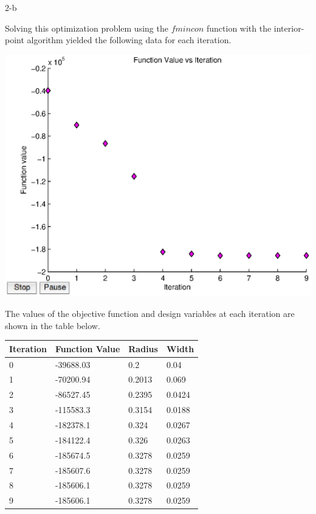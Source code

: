 \documentclass[11pt]{article}
\begin{document}
\begin{problem}{2-b}
\end{problem}
\begin{solution}
Solving this optimization problem using the $fmincon$ function with the interior-point algorithm yielded the following data for each iteration.

\begin{center}
\includegraphics[scale=0.75]{problem2/problem2.eps}
\end{center}

The values of the objective function and design variables at each iteration are shown in the table below.
\begin{center}
\begin{table}
    \begin{tabular}{|l|l|l|l|}
        \hline
       Iteration & Function Value & Radius & Width\\ \hline
0 & -39688.03 & 0.2 & 0.04\\ 
1 & -70200.94 & 0.2013 & 0.069\\ 
2 & -86527.45 & 0.2395 & 0.0424\\ 
3 & -115583.3 & 0.3154 & 0.0188\\ 
4 & -182378.1 & 0.324 & 0.0267\\ 
5 & -184122.4 & 0.326 & 0.0263\\ 
6 & -185674.5 & 0.3278 & 0.0259\\ 
7 & -185607.6 & 0.3278 & 0.0259\\ 
8 & -185606.1 & 0.3278 & 0.0259\\ 
9 & -185606.1 & 0.3278 & 0.0259\\ 
        \hline
    \end{tabular}
\end{table}
\end{center}


\end{solution}
\end{document}
